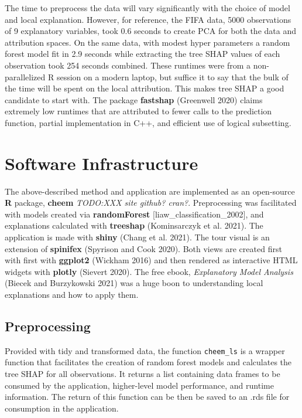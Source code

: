 \documentclass[
]{article}
\begin{document}
The time to preprocess the data will vary significantly with the choice of model and local explanation. However, for reference, the FIFA data, 5000 observations of 9 explanatory variables, took 0.6 seconds to create PCA for both the data and attribution spaces. On the same data, with modest hyper parameters a random forest model fit in 2.9 seconds while extracting the tree SHAP values of each observation took 254 seconds combined. These runtimes were from a non-parallelized R session on a modern laptop, but suffice it to say that the bulk of the time will be spent on the local attribution. This makes tree SHAP a good candidate to start with. The package \textbf{fastshap} (Greenwell 2020) claims extremely low runtimes that are attributed to fewer calls to the prediction function, partial implementation in C++, and efficient use of logical subsetting.

\hypertarget{sec:softwareinfrastructure}{%
\section{Software Infrastructure}\label{sec:softwareinfrastructure}}

The above-described method and application are implemented as an open-source \textbf{R} package, \textbf{cheem} \emph{TODO:XXX site github? cran?}. Preprocessing was facilitated with models created via \textbf{randomForest} {[}liaw\_classification\_2002{]}, and explanations calculated with \textbf{treeshap} (Kominsarczyk et al. 2021).
The application is made with \textbf{shiny} (Chang et al. 2021). The tour visual is an extension of \textbf{spinifex} (Spyrison and Cook 2020). Both views are created first with first with \textbf{ggplot2} (Wickham 2016) and then rendered as interactive HTML widgets with \textbf{plotly} (Sievert 2020). The free ebook, \emph{Explanatory Model Analysis} (Biecek and Burzykowski 2021) was a huge boon to understanding local explanations and how to apply them.

\hypertarget{preprocessing-1}{%
\subsection{Preprocessing}\label{preprocessing-1}}

Provided with tidy and transformed data, the function \texttt{cheem\_ls} is a wrapper function that facilitates the creation of random forest models and calculates the tree SHAP for all observations. It returns a list containing data frames to be consumed by the application, higher-level model performance, and runtime information. The return of this function can be then be saved to an .rds file for consumption in the application.
\end{document}
